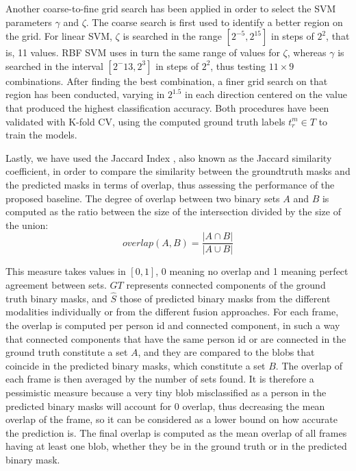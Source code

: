 \documentclass[10pt,twocolumn,letterpaper]{article}
\begin{document}
Another coarse-to-fine grid search has been applied in order to select the SVM parameters $\gamma$ and $\zeta$. The coarse search is first used to identify a better region on the grid. For linear SVM, $\zeta$ is searched in the range $[2^{-5}, 2^{15}]$ in steps of $2^2$, that is, 11 values. RBF SVM uses in turn the same range of values for $\zeta$, whereas $\gamma$ is searched in the interval $[2^-13, 2^3]$ in steps of $2^2$, thus testing $11 \times 9$ combinations. After finding the best combination, a finer grid search on that region has been conducted, varying in $2^{1.5}$ in each direction centered on the value that produced the highest classification accuracy. Both procedures have been validated with K-fold CV, using the computed ground truth labels $t_{r}^m \in T$ to train the models.


Lastly, we have used the Jaccard Index \cite{tan2002selecting}, also known as the Jaccard similarity coefficient, in order to compare the similarity between the groundtruth masks and the predicted masks in terms of overlap, thus assessing the performance of the proposed baseline. The degree of overlap between two binary sets $A$ and $B$ is computed as the ratio between the size of the intersection divided by the size of the union:
\begin{equation} \label{eq:jaccard}
overlap(A, B) = \frac{|A \cap B|}{|A \cup B|}
\end{equation}

This measure takes values in $[0,1]$, 0 meaning no overlap and 1 meaning perfect agreement between sets. $GT$ represents connected components of the ground truth binary masks, and $\hat{S}$ those of predicted binary masks from the different modalities individually or from the different fusion approaches. For each frame, the overlap is computed per person id and connected component, in such a way that connected components that have the same person id  or are connected in the ground truth constitute a set $A$, and they are compared to the blobs that coincide in the predicted binary masks, which constitute a set $B$. The overlap of each frame is then averaged by the number of sets found. It is therefore a pessimistic measure because a very tiny blob misclassified as a person in the predicted binary masks will account for 0 overlap, thus decreasing the mean overlap of the frame, so it can be considered as a lower bound on how accurate the prediction is. The final overlap is computed as the mean overlap of all frames having at least one blob, whether they be in the ground truth or in the predicted binary mask.
\end{document}
